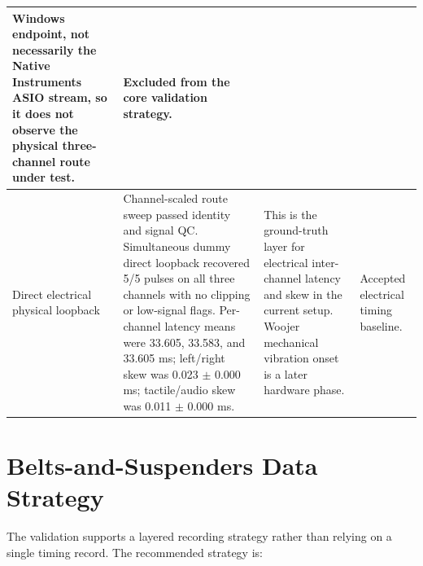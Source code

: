 \documentclass[11pt]{article}
\begin{document}
\begin{longtable}{|p{}|p{}|p{}|p{}|}
Windows endpoint, not necessarily the Native Instruments ASIO stream, so it
does not observe the physical three-channel route under test. & Excluded from
the core validation strategy. \\
\hline
Direct electrical physical loopback & Channel-scaled route sweep passed
identity and signal QC. Simultaneous dummy direct loopback recovered 5/5 pulses
on all three channels with no clipping or low-signal flags. Per-channel latency
means were 33.605, 33.583, and 33.605 ms; left/right skew was
0.023 $\pm$ 0.000 ms; tactile/audio skew was 0.011 $\pm$ 0.000 ms. & This is
the ground-truth layer for electrical inter-channel latency and skew in the
current setup. Woojer mechanical vibration onset is a later hardware phase. &
Accepted electrical timing baseline. \\
\hline
\end{longtable}

\section{Belts-and-Suspenders Data Strategy}

The validation supports a layered recording strategy rather than relying on a
single timing record. The recommended strategy is:
\end{document}
